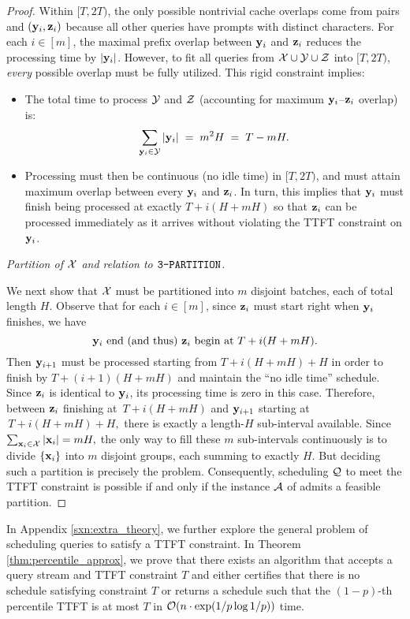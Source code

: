 \begin{proof}
Within $[T, 2T)$, the only possible nontrivial cache overlaps come from pairs and $(\mathbf{y}_i, \mathbf{z}_i)$ because all other queries have prompts with distinct characters. For each $i\in [m]$, the maximal prefix overlap between $\mathbf{y}_i$ and $\mathbf{z}_i$ reduces the processing time by $|\mathbf{y}_i|$. However, to fit all queries from $\mathcal{X} \cup \mathcal{Y} \cup \mathcal{Z}$ into $[T,2T)$, \emph{every} possible overlap must be fully utilized. This rigid constraint implies:
\begin{itemize}
    \item The total time to process $\mathcal{Y}$ and $\mathcal{Z}$ (accounting for maximum $\mathbf{y}_i$--$\mathbf{z}_i$ overlap) is: 
    \[
        \sum_{\mathbf{y}_i \in \mathcal{Y}} |\mathbf{y}_i|
        \;=\; m^2H \;=\; T - mH.
    \]
    \item Processing must then be continuous (no idle time) in $[T,2T)$, and must attain maximum overlap between every $\mathbf{y}_i$ and $\mathbf{z}_i$. In turn, this implies that $\mathbf{y}_i$ must finish being processed at exactly $T + i(H + mH)$ so that $\mathbf{z}_i$ can be processed immediately as it arrives without violating the TTFT constraint on $\mathbf{y}_i$. 
\end{itemize}

\emph{Partition of $\mathcal{X}$ and relation to $\texttt{3-PARTITION}$.}

We next show that \(\mathcal{X}\) must be partitioned into \(m\) disjoint batches, each of total length \(H\).  
Observe that for each \(i\in[m]\), since \(\mathbf{z}_i\) must start right when \(\mathbf{y}_i\) finishes, we have 
\[
\mathbf{y}_i \text{ end (and thus) } \mathbf{z}_i \text{ begin at } T + i(H + mH).
\]
Then \(\mathbf{y}_{i+1}\) must be processed starting from $T + i(H + mH) + H$
in order to finish by \(T + (i+1)(H + mH)\) and maintain the “no idle time” schedule. Since $\mathbf{z}_i$ is identical to $\mathbf{y}_i$, its processing time is zero in this case. Therefore, between \(\mathbf{z}_i\) finishing at \(\,T + i(H + mH)\) and \(\mathbf{y}_{i+1}\) starting at \(\,T + i(H + mH) + H,\) there is exactly a length-\(H\) sub-interval available.   
Since \(\sum_{\mathbf{x}_i\in\mathcal{X}} |\mathbf{x}_i| = mH,\) the only way to fill these \(m\) sub-intervals continuously is to divide \(\{\mathbf{x}_i\}\) into \(m\) disjoint groups, each summing to exactly \(H\).  But deciding such a partition is precisely the \tpart{} problem.  Consequently, scheduling \(\mathcal{Q}\) to meet the TTFT constraint is possible if and only if the instance \(\mathcal{A}\) of \tpart{} admits a feasible partition.

\end{proof}


In Appendix \ref{sxn:extra_theory}, we further explore the general problem of scheduling queries to satisfy a TTFT constraint. In Theorem \ref{thm:percentile_approx}, we prove that there exists an algorithm that accepts a query stream and TTFT constraint $T$ and either certifies that there is no schedule satisfying constraint $T$ or returns a schedule such that the $(1-p)$-th percentile TTFT is at most $T$ in $\mathcal{O}(n \cdot \exp(1/p \log 1/p))$ time.

